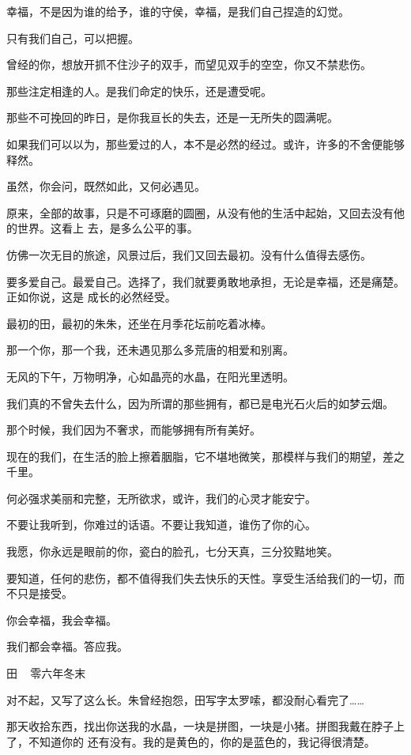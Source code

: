 \documentclass[12pt,a4paper]{article}
\def\blankrev{\vspace{1ex}}									%
\begin{document}
		幸福，不是因为谁的给予，谁的守侯，幸福，是我们自己捏造的幻觉。\par
		只有我们自己，可以把握。\par
		曾经的你，想放开抓不住沙子的双手，而望见双手的空空，你又不禁悲伤。\par
		那些注定相逢的人。是我们命定的快乐，还是遭受呢。\par
		那些不可挽回的昨日，是你我亘长的失去，还是一无所失的圆满呢。\par
		如果我们可以以为，那些爱过的人，本不是必然的经过。或许，许多的不舍便能够释然。\par
		虽然，你会问，既然如此，又何必遇见。


		原来，全部的故事，只是不可琢磨的圆圈，从没有他的生活中起始，又回去没有他的世界。这看上
	去，是多么公平的事。

		仿佛一次无目的旅途，风景过后，我们又回去最初。没有什么值得去感伤。

		要多爱自己。最爱自己。选择了，我们就要勇敢地承担，无论是幸福，还是痛楚。正如你说，这是
	成长的必然经受。


		最初的田，最初的朱朱，还坐在月季花坛前吃着冰棒。\par
		那一个你，那一个我，还未遇见那么多荒唐的相爱和别离。\par
		无风的下午，万物明净，心如晶亮的水晶，在阳光里透明。\par
		我们真的不曾失去什么，因为所谓的那些拥有，都已是电光石火后的如梦云烟。

		那个时候，我们因为不奢求，而能够拥有所有美好。\par
		现在的我们，在生活的脸上擦着胭脂，它不堪地微笑，那模样与我们的期望，差之千里。\par
		何必强求美丽和完整，无所欲求，或许，我们的心灵才能安宁。\par
		不要让我听到，你难过的话语。不要让我知道，谁伤了你的心。\par
		我愿，你永远是眼前的你，瓷白的脸孔，七分天真，三分狡黠地笑。\par
		要知道，任何的悲伤，都不值得我们失去快乐的天性。享受生活给我们的一切，而不只是接受。

		你会幸福，我会幸福。\par
		我们都会幸福。答应我。


		\blankrev
		田 ~ 零六年冬末


		\blankrev \blankrev
		对不起，又写了这么长。朱曾经抱怨，田写字太罗嗦，都没耐心看完了……


		那天收拾东西，找出你送我的水晶，一块是拼图，一块是小猪。拼图我戴在脖子上了，不知道你的
	还有没有。我的是黄色的，你的是蓝色的，我记得很清楚。
\end{document}
